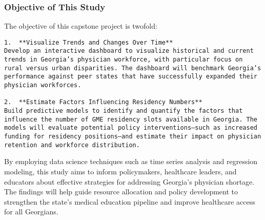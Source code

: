 \documentclass[
]{article}
\begin{document}
\subsubsection{Objective of This Study}\label{objective-of-this-study}

The objective of this capstone project is twofold:

\begin{verbatim}
1.  **Visualize Trends and Changes Over Time**
Develop an interactive dashboard to visualize historical and current trends in Georgia’s physician workforce, with particular focus on rural versus urban disparities. The dashboard will benchmark Georgia’s performance against peer states that have successfully expanded their physician workforces.

2.  **Estimate Factors Influencing Residency Numbers**
Build predictive models to identify and quantify the factors that influence the number of GME residency slots available in Georgia. The models will evaluate potential policy interventions—such as increased funding for residency positions—and estimate their impact on physician retention and workforce distribution.
\end{verbatim}

By employing data science techniques such as time series analysis and
regression modeling, this study aims to inform policymakers, healthcare
leaders, and educators about effective strategies for addressing
Georgia's physician shortage. The findings will help guide resource
allocation and policy development to strengthen the state's medical
education pipeline and improve healthcare access for all Georgians.
\end{document}
